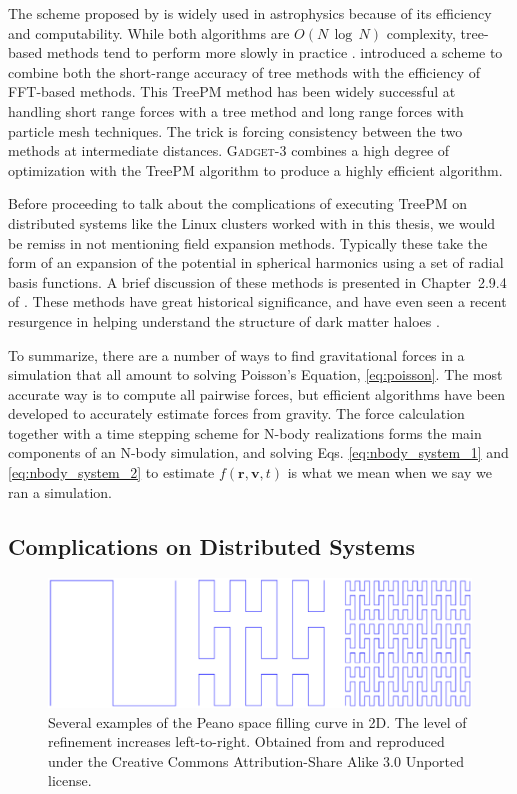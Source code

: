 The scheme proposed by \citet{barnes_hut} is widely used in astrophysics because of its efficiency and computability. While both algorithms are $O(N\,\log\, N)$ complexity, tree-based methods tend to perform more slowly in practice \citep{GadgetCodePaper}. \citet{xu_treepm} introduced a scheme to combine both the short-range accuracy of tree methods with the efficiency of FFT-based methods. This TreePM method has been widely successful at handling short range forces with a tree method and long range forces with particle mesh techniques. The trick is forcing consistency between the two methods at intermediate distances. \textsc{Gadget-3} combines a high degree of optimization with the TreePM algorithm to produce a highly efficient algorithm.

Before proceeding to talk about the complications of executing TreePM on distributed systems like the Linux clusters worked with in this thesis, we would be remiss in not mentioning field expansion methods. Typically these take the form of an expansion of the potential in spherical harmonics using a set of radial basis functions. A brief discussion of these methods is presented in Chapter~2.9.4 of \citet{BT}. These methods have great historical significance, and have even seen a recent resurgence in helping understand the structure of dark matter haloes \citep{lilley_2018_a, lilley_2018_b}.

To summarize, there are a number of ways to find gravitational forces in a simulation that all amount to solving Poisson's Equation, \eqref{eq:poisson}. The most accurate way is to compute all pairwise forces, but efficient algorithms have been developed to accurately estimate forces from gravity. The force calculation together with a time stepping scheme for N-body realizations forms the main components of an N-body simulation, and solving Eqs. \eqref{eq:nbody_system_1} and \eqref{eq:nbody_system_2} to estimate $f(\textbf{r},\textbf{v},t)$ is what we mean when we say we ran a simulation.

\subsection{Complications on Distributed Systems}

\begin{figure}
	\centering
	\includegraphics[width=\textwidth]{../figures/Peanocurve.eps}
	\caption{Several examples of the Peano space filling curve in 2D. The level of refinement increases left-to-right. Obtained from \citet{peano} and reproduced under the Creative Commons Attribution-Share Alike 3.0 Unported license.}\label{fig:peano}
\end{figure}

